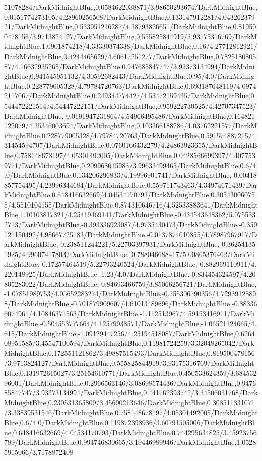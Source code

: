{\begin{tikzternal}
51078284/DarkMidnightBlue,0.0584622038871/3.98650293674/DarkMidnightBlue,0.0151774273105/4.28960256508/DarkMidnightBlue,0.133147912281/4.04326237921/DarkMidnightBlue,0.533951216287/4.38793826651/DarkMidnightBlue,0.819500478156/3.9713824127/DarkMidnightBlue,0.555825844919/3.93175316769/DarkMidnightBlue,1.0901874218/4.33330374338/DarkMidnightBlue,0.16/4.27712812921/DarkMidnightBlue,0.4244465629/4.60617251277/DarkMidnightBlue,0.782518080587/4.16632935265/DarkMidnightBlue,0.947685847747/3.93373134994/DarkMidnightBlue,0.941545951132/4.30592682443/DarkMidnightBlue,0.95/4.0/DarkMidnightBlue,0.228779005328/4.79784720763/DarkMidnightBlue,0.693187648119/4.09742117067/DarkMidnightBlue,0.249344774427/4.53472159435/DarkMidnightBlue,0.544472221514/4.54447222151/DarkMidnightBlue,0.959222730525/4.42707347523/DarkMidnightBlue,-0.0191947231864/4.54966495486/DarkMidnightBlue,0.164821122079/4.35346003694/DarkMidnightBlue,0.103366188286/4.03762221577/DarkMidnightBlue,0.228779005328/4.79784720763/DarkMidnightBlue,0.591574887215/4.31454594707/DarkMidnightBlue,0.0760166432279/4.24863923655/DarkMidnightBlue,0.758148678197/4.05301492005/DarkMidnightBlue,0.0428566699397/4.4077539771/DarkMidnightBlue,0.209968015983/3.99633499465/DarkMidnightBlue,0.6/4.0/DarkMidnightBlue,0.134206296833/4.19896901741/DarkMidnightBlue,-0.00418857754495/4.23996344684/DarkMidnightBlue,0.559711743463/4.34974671439/DarkMidnightBlue,0.648416632669/4.04534170793/DarkMidnightBlue,0.305430060755/4.5510104155/DarkMidnightBlue,0.874310646716/4.52533883641/DarkMidnightBlue,1.10103817321/4.25419469141/DarkMidnightBlue,-0.434543648362/5.0755332713/DarkMidnightBlue,-0.393336923087/4.9735430473/DarkMidnightBlue,-0.359121150492/4.98667725183/DarkMidnightBlue,-0.0137874010855/4.78987967917/DarkMidnightBlue,-0.238511244221/5.22703397931/DarkMidnightBlue,-0.362541351925/4.99607417803/DarkMidnightBlue,-0.788046688417/5.00865376462/DarkMidnightBlue,-0.17257464519/5.22793240524/DarkMidnightBlue,-0.882969110911/4.220148925/DarkMidnightBlue,-1.23/4.0/DarkMidnightBlue,-0.834454324597/4.20805283022/DarkMidnightBlue,-0.84693466759/3.85066256721/DarkMidnightBlue,-1.07851989753/4.05652283274/DarkMidnightBlue,-0.755306790356/4.72939128898/DarkMidnightBlue,-0.701879909607/4.61013489696/DarkMidnightBlue,-0.883366074961/4.10846371563/DarkMidnightBlue,-1.112513967/4.59153416911/DarkMidnightBlue,-0.504553777664/4.12579938571/DarkMidnightBlue,-1.06521124665/4.615/DarkMidnightBlue,-1.09129447256/4.25194518087/DarkMidnightBlue,0.626408951585/3.45547100594/DarkMidnightBlue,0.11981724259/3.32048265042/DarkMidnightBlue,0.172551121862/3.49887515493/DarkMidnightBlue,0.819500478156/3.9713824127/DarkMidnightBlue,0.555825844919/3.93175316769/DarkMidnightBlue,0.131972615027/3.25154610771/DarkMidnightBlue,0.450533624359/3.68453296001/DarkMidnightBlue,0.2966563146/3.08698574436/DarkMidnightBlue,0.947685847747/3.93373134994/DarkMidnightBlue,0.441762393742/3.34506031768/DarkMidnightBlue,0.230531365809/3.45690213646/DarkMidnightBlue,0.308511331071/3.33839531546/DarkMidnightBlue,0.758148678197/4.05301492005/DarkMidnightBlue,0.6/4.0/DarkMidnightBlue,0.119872398936/3.60791505006/DarkMidnightBlue,0.648416632669/4.04534170793/DarkMidnightBlue,0.744295634825/3.45923756789/DarkMidnightBlue,0.994746830665/3.19446989946/DarkMidnightBlue,1.05285915066/3.7178872408
\end{tikzternal}}
